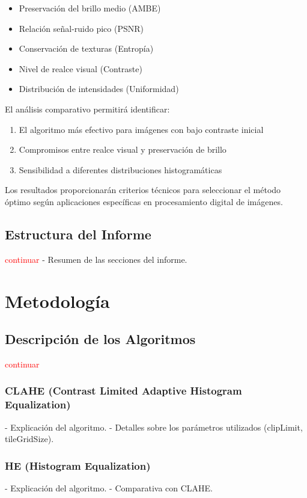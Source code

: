 \documentclass[sigchi]{acmart}
\newcommand{\rojo}[1]{\textcolor{red}{#1}}
\begin{document}
\begin{itemize}
	\item Preservación del brillo medio (AMBE)
	\item Relación señal-ruido pico (PSNR)
	\item Conservación de texturas (Entropía)
	\item Nivel de realce visual (Contraste)
	\item Distribución de intensidades (Uniformidad)
\end{itemize}

El análisis comparativo permitirá identificar:
\begin{enumerate}
	\item El algoritmo más efectivo para imágenes con bajo contraste inicial
	\item Compromisos entre realce visual y preservación de brillo
	\item Sensibilidad a diferentes distribuciones histogramáticas
\end{enumerate}

Los resultados proporcionarán criterios técnicos para seleccionar el método óptimo según
aplicaciones específicas en procesamiento digital de imágenes.

\subsection{Estructura del Informe}
\rojo{continuar}
- Resumen de las secciones del informe.

\section{Metodología}
\subsection{Descripción de los Algoritmos}
\rojo{continuar}
\subsubsection{CLAHE (Contrast Limited Adaptive Histogram Equalization)}
- Explicación del algoritmo.
- Detalles sobre los parámetros utilizados (clipLimit, tileGridSize).

\subsubsection{HE (Histogram Equalization)}
- Explicación del algoritmo.
- Comparativa con CLAHE.
\end{document}
